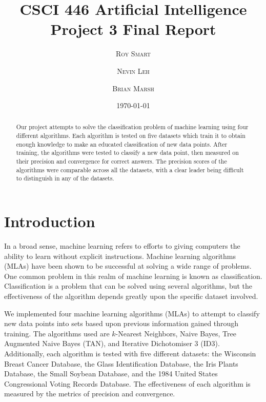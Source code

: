 \documentclass{article}
\title{\vspace{-15mm}\fontsize{24pt}{10pt}\selectfont\textbf{CSCI 446 Artificial Intelligence \\ Project 3 Final Report} \\[-2mm]} %
\date{\today}
\author{
\large
\textsc{Roy Smart} \and \textsc{Nevin Leh} \and \textsc{Brian Marsh}\\[2mm] %
}
\begin{document}
\maketitle %

\thispagestyle{fancy} %



\normalsize

\begin{abstract}

	Our project attempts to solve the classification problem of machine learning using four different algorithms.  
	Each algorithm is tested on five datasets which train it to obtain enough knowledge to make an educated classification of new data points.  
	After training, the algorithms were tested to classify a new data point, then measured on their precision and convergence for correct answers.  
	The precision scores of the algorithms were comparable across all the datasets, with a clear leader being difficult to distinguish in any of the datasets.
	
\end{abstract}
\section{Introduction}

	In a broad sense, machine learning refers to efforts to giving computers the ability to learn without explicit instructions. 
	Machine learning algorithms (MLAs) have been shown to be successful at solving a wide range of problems.  
	One common problem in this realm of machine learning is known as classification. 
	Classification is a problem that can be solved using several algorithms, but the effectiveness of the algorithm depends greatly upon the specific dataset involved.
	  
	We implemented four machine learning algorithms (MLAs) to attempt to classify new data points into sets based upon previous information gained through training.  
	The algorithms used are $k$-Nearest Neighbors, Naive Bayes, Tree Augmented Naive Bayes (TAN), and Iterative Dichotomiser 3 (ID3).  
	Additionally, each algorithm is tested with five different datasets: the Wisconsin Breast Cancer Database, the Glass Identification Database, the Iris Plants Database, the Small Soybean Database, and the 1984 United States Congressional Voting Records Database.  
	The effectiveness of each algorithm is measured by the metrics of precision and convergence.  
\end{document}
